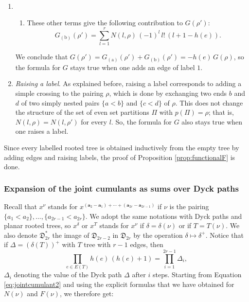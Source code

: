 \documentclass[12pt,a4paper,reqno]{amsart}
\newcommand{\dym}{\mathfrak{D}}
\theoremstyle{remark}
\begin{document}
\begin{enumerate}
\item[]~ \setcounter{enumi}{1}
\begin{enumerate}
\item[] These other terms give the following contribution to $G(\rho')$:
$$G_{(\textrm{b})}(\rho')=\sum_{l=1}^{r}N(l,\rho)\,(-1)^{l}\,l!\,(l+1-h(e)).$$
\vspace{1mm}
\end{enumerate}
We conclude that $G(\rho')=G_{(\textrm{a})}(\rho')+G_{(\textrm{b})}(\rho')=-h(e)\,G(\rho)$, so the formula for $G$ stays true when one adds an edge of label $1$.
\vspace{3mm}

\item \emph{Raising a label}. As explained before, raising a label corresponds to adding a simple crossing to the pairing $\rho$, which is done by exchanging two ends $b$ and $d$ of two simply nested pairs $\{a<b\}$ and $\{c<d\}$ of $\rho$. This does not change the structure of the set of even set partitions $\Pi$ with $p(\Pi)=\rho$; that is, $N(l,\rho)=N(l,\rho')$ for every $l$. So, the formula for $G$ also stays true when one raises a label.
 \vspace{3mm}
 \end{enumerate}
Since every labelled rooted tree is obtained inductively from the empty tree by adding edges and raising labels, the proof of Proposition \ref{prop:functionalF} is done.



\subsubsection{Expansion of the joint cumulants as sums over Dyck paths}
Recall that $x^{\nu}$ stands for $x^{(\mathbf{a}_2-\mathbf{a}_1)+\cdots+(\mathbf{a}_{2r}-\mathbf{a}_{2r-1})}$ if $\nu$ is the pairing $\{a_1<a_2\},\ldots,\{a_{2r-1}<a_{2r}\}$. We adopt the same notations with Dyck paths and planar rooted trees, so $x^\delta$ or $x^T$ stands for $x^\nu$ if $\delta=\delta(\nu)$ or if $T=T(\nu)$. We also denote $\dym_{2r}^*$ the image of $\dym_{2r-2}$ in $\dym_{2r}$ by the operation $\delta \mapsto \delta^+$. Notice that if $\Delta=(\delta(T))^+$ with $T$ tree with $r-1$ edges, then
$$\prod_{e \in E(T)} h(e)\,(h(e)+1)= \prod_{i=1}^{2r-1} \Delta_i,$$
$\Delta_i$ denoting the value of the Dyck path $\Delta$ after $i$ steps. Starting from Equation \eqref{eq:jointcumulant2} and using the explicit formulas that we have obtained for $N(\nu)$ and $F(\nu)$, we therefore get:
\end{document}
